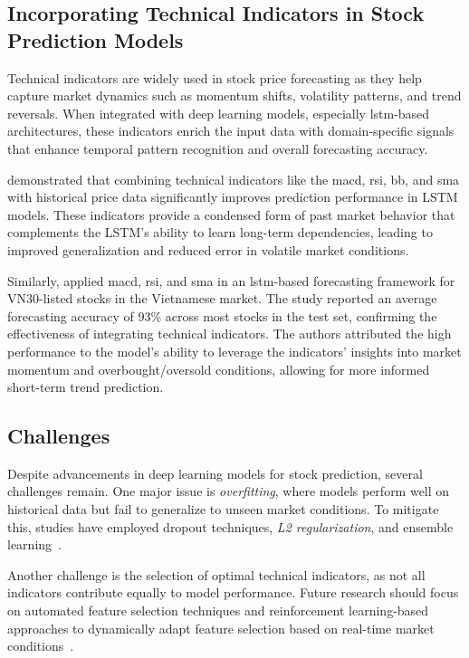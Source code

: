 \subsection{Incorporating Technical Indicators in Stock Prediction Models}

Technical indicators are widely used in stock price forecasting as they help capture 
market dynamics such as momentum shifts, volatility patterns, and trend
reversals. When integrated with deep learning models, 
especially \acrshort{lstm}-based architectures, these indicators enrich the input data 
with domain-specific
signals that enhance temporal pattern recognition and overall forecasting accuracy.

\parencite{guo2024LSTMStock} demonstrated that combining technical indicators like the \acrfull{macd},
\acrfull{rsi}, \acrfull{bb}, and \acrfull{sma} with historical price data significantly improves prediction 
performance in LSTM models. These indicators provide a condensed form of past market behavior that 
complements the LSTM’s ability to learn long-term dependencies, leading to improved generalization and 
reduced error in volatile market conditions.

Similarly, \textcite{phuoc2024StockPrediction} applied \acrshort{macd}, \acrshort{rsi}, and \acrshort{sma} 
in an \acrshort{lstm}-based forecasting framework for VN30-listed stocks in the Vietnamese market. The 
study reported an average forecasting accuracy of 93\% across most stocks in the test set, confirming the
effectiveness of integrating technical indicators. The authors attributed the high performance to the 
model’s ability to leverage the indicators' insights into market momentum and overbought/oversold 
conditions, allowing for more informed short-term trend prediction.

\subsection{Challenges}

Despite advancements in deep learning models for stock prediction, several challenges remain. One major
issue is \emph{overfitting}, where models perform well on historical data but fail to generalize 
to unseen market conditions. To mitigate this, studies have employed dropout techniques, 
\emph{L2 regularization}, and ensemble learning~\parencite{shaban2024SMPDL, chang2024StockPrediction}.

Another challenge is the selection of optimal technical indicators, as not all indicators contribute 
equally to model performance. Future research should focus on automated feature selection techniques
and reinforcement learning-based approaches to dynamically adapt feature selection based on
real-time market conditions~\parencite{balasubramanian2023SystematicSurvey}.

